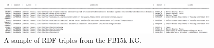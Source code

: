 \begin{figure}
   	\centering
    	\includegraphics[width=1.0\textwidth, height=0.4\textwidth]{fb15k_fact_sample}
	\captionsetup{justification=centering}
	\caption{A sample of RDF triples from the FB15k KG.}
\end{figure}



